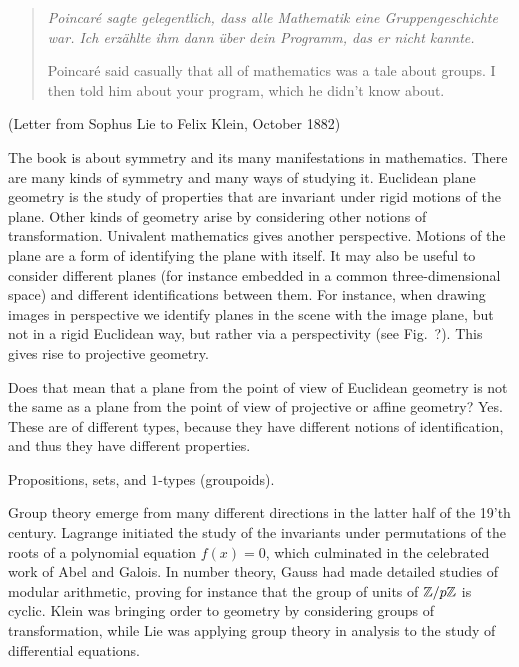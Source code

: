 \label{ch:intro}

\begin{quote}
  \itshape Poincar\'e sagte gelegentlich,
  dass alle Mathematik eine Gruppengeschichte war.
  Ich erz\"ahlte ihm dann \"uber dein Programm,
  das er nicht kannte.

  \smallskip

  \noindent Poincar\'e said casually
  that all of mathematics was a tale about groups.
  I then told him about your program,
  which he didn't know about.
\end{quote}
\hfill (Letter from Sophus Lie to Felix Klein, October 1882)

\bigskip


The book is about symmetry and its many manifestations in mathematics.
There are many kinds of symmetry and many ways of studying it.
Euclidean plane geometry is the study of properties that are invariant under rigid motions of the plane.
Other kinds of geometry arise by considering other notions of transformation.
Univalent mathematics gives another perspective.
Motions of the plane are a form of identifying the plane with itself.
It may also be useful to consider different planes
(for instance embedded in a common three-dimensional space)
and different identifications between them.
For instance, when drawing images in perspective
we identify planes in the scene with the image plane,
but not in a rigid Euclidean way, but
rather via a perspectivity (see Fig.~?).
This gives rise to projective geometry.

Does that mean that a plane from the point of view of Euclidean
geometry is not the same as a plane from the point of view of
projective or affine geometry?
Yes.
These are of different types,
because they have different notions of identification,
and thus they have different properties.

Propositions, sets, and $1$-types (groupoids).

Group theory emerge from many different directions in the latter half of the 19'th century.
Lagrange initiated the study of the invariants under permutations
of the roots of a polynomial equation $f(x)=0$,
which culminated in the celebrated work of Abel and Galois.
In number theory, Gauss had made detailed studies of modular arithmetic,
proving for instance that the group of units of $\mathbb{Z}/p\mathbb{Z}$ is cyclic.
Klein was bringing order to geometry by considering groups of transformation,
while Lie was applying group theory in analysis to the study of differential equations.

